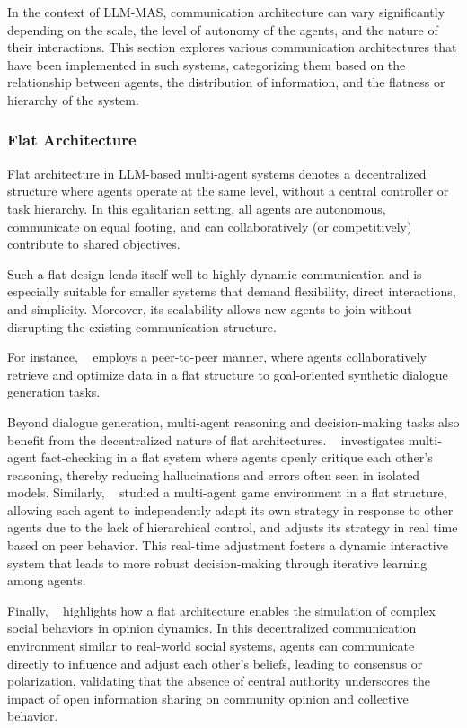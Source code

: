 In the context of LLM-MAS, communication architecture can vary significantly depending on the scale, the level of autonomy of the agents, and the nature of their interactions. This section explores various communication architectures that have been implemented in such systems, categorizing them based on the relationship between agents, the distribution of information, and the flatness or hierarchy of the system.

\subsubsection{Flat Architecture}

Flat architecture in LLM-based multi-agent systems denotes a decentralized structure where agents operate at the same level, without a central controller or task hierarchy. In this egalitarian setting, all agents are autonomous, communicate on equal footing, and can collaboratively (or competitively) contribute to shared objectives.

Such a flat design lends itself well to highly dynamic communication and is especially suitable for smaller systems that demand flexibility, direct interactions, and simplicity. Moreover, its scalability allows new agents to join without disrupting the existing communication structure.

For instance, ~\cite{dataset_generation} employs a peer-to-peer manner, where agents collaboratively retrieve and optimize data in a flat structure to goal-oriented synthetic dialogue generation tasks.

Beyond dialogue generation, multi-agent reasoning and decision-making tasks also benefit from the decentralized nature of flat architectures. ~\cite{debate_improve_llm_1} investigates multi-agent fact-checking in a flat system where agents openly critique each other’s reasoning, thereby reducing hallucinations and errors often seen in isolated models. Similarly, ~\cite{evaluating_llm_game_ability} studied a multi-agent game environment in a flat structure, allowing each agent to independently adapt its own strategy in response to other agents due to the lack of hierarchical control, and adjusts its strategy in real time based on  peer behavior. This real-time adjustment fosters a dynamic interactive system that leads to more robust decision-making through iterative learning among agents.

Finally, ~\cite{simulating_opinion_dynamic} highlights how a flat architecture enables the simulation of complex social behaviors in opinion dynamics. In this decentralized communication environment similar to real-world social systems, agents can communicate directly to influence and adjust each other's beliefs, leading to consensus or polarization, validating that the absence of central authority underscores the impact of open information sharing on community opinion and collective behavior.

